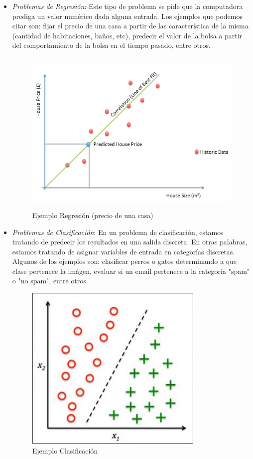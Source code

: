 \begin{itemize}
\item \textit{Problemas de Regresión}: Este tipo de problema se pide que la computadora prediga un valor numérico dada alguna entrada. Los ejemplos que podemos citar son: fijar el precio de una casa a partir de las característica de la misma (cantidad de habitaciones, baños, etc), predecir el valor de la bolsa a partir del comportamiento de la bolsa en el tiempo pasado, entre otros.

\begin{figure}[H] \centering
  \includegraphics[height=8cm,keepaspectratio=true,clip=true]{imagenes/MarcoTeorico/regression_linear.png}
  \caption{Ejemplo Regresión (precio de una casa)}\label{Fig:regression}
\end{figure}

\item \textit{Problemas de Clasificación}: En un problema de clasificación, estamos tratando de predecir los resultados en una
salida discreta. En otras palabras, estamos tratando de asignar variables de entrada en categorías discretas. Algunos de los ejemplos son: clasificar perros o gatos determinando a que clase pertenece la imágen, evaluar si un email pertenece a la categoria "spam" o "no spam", entre otros.

\begin{figure}[H] \centering
  \includegraphics[height=8cm,keepaspectratio=true,clip=true]{imagenes/MarcoTeorico/classification.jpg}
  \caption{Ejemplo Clasificación}\label{Fig:clasificacion}
\end{figure}



\end{itemize}
